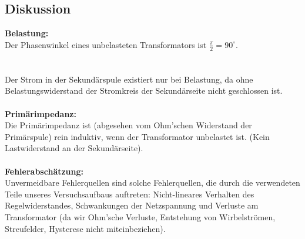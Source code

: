 \documentclass{article}
\begin{document}
\subsection{Diskussion}
\textbf{Belastung:}\\
Der Phasenwinkel eines unbelasteten Transformators ist $\frac{\pi}{2}=90^\circ$.\\
\\
\\
Der Strom in der Sekundärspule existiert nur bei Belastung, da ohne Belastungswiderstand der Stromkreis der Sekundärseite nicht geschlossen ist. \\
\\
\textbf{Primärimpedanz:}\\
Die Primärimpedanz ist (abgesehen vom Ohm'schen Widerstand der Primärspule) rein induktiv, wenn der Transformator unbelastet ist. (Kein Lastwiderstand an der Sekundärseite).\\
\\
\textbf{Fehlerabschätzung:}\\
Unvermeidbare Fehlerquellen sind solche Fehlerquellen, die durch die verwendeten Teile unseres Versuchsaufbaus auftreten: Nicht-lineares Verhalten des Regelwiderstandes, Schwankungen der Netzspannung und Verluste am Transformator (da wir Ohm'sche Verluste, Entstehung von Wirbelströmen, Streufelder, Hysterese nicht miteinbeziehen).
\end{document}
